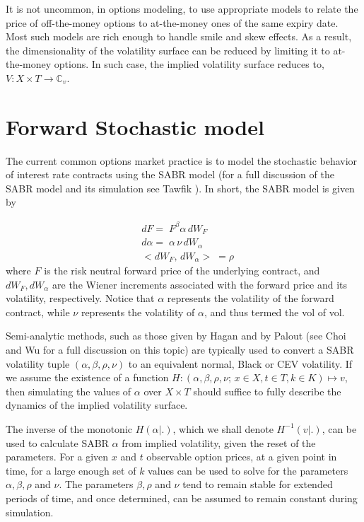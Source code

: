 \documentclass[12pt,oneside]{article}
\newcommand{\beqn}{\begin{equation}}
\newcommand{\eeqn}{\end{equation}}
\let\oin\in
\renewcommand{\in}{\!\oin\!}
\numberwithin{equation}{section}
\begin{document}
It is not uncommon, in options modeling,
to use appropriate models to relate the price of
off-the-money options to at-the-money ones of the same
expiry date.
Most such models are rich enough to handle smile and skew effects.
As a result, the dimensionality of the volatility surface can be reduced
by limiting it to at-the-money options.
In such case,
the implied volatility surface reduces to,
$V: X\times T\rightarrow \mathbb{C}_v$.

\section{Forward Stochastic model}\label{sec:sm}
The current common options market practice is to model the stochastic behavior of interest rate contracts
using the SABR model (for a full discussion of the SABR model and its simulation see Tawfik \cite{T1}).
In short, the SABR model is given by

\beqn\label{eq:sabr}
\begin{aligned}
&dF =\; F^\beta \alpha\, dW_F\\
&d\alpha =\;\alpha\, \nu\, dW_\alpha\\
&<dW_F,\, dW_\alpha> \;=\rho
\end{aligned}
\eeqn
where $F$ is the risk neutral forward price of the underlying contract,
and $dW_F, dW_\alpha$ are the Wiener increments associated with
the forward price and its volatility, respectively.
Notice that $\alpha$ represents the volatility of the forward contract,
while $\nu$ represents the volatility of $\alpha$, and thus
termed the vol of vol.

Semi-analytic methods, such as those given by Hagan and by Palout
(see Choi and Wu \cite{CW} for a full discussion on this topic)
are typically used to convert a SABR volatility tuple $(\alpha, \beta, \rho, \nu)$
to an equivalent normal, Black or CEV volatility.
If we assume the existence of a function
$H:(\alpha,\beta,\rho,\nu;\,x\in X, t\in T, k\in K)\mapsto v$,
then simulating the values of $\alpha$ over $X\times T$
should suffice to fully describe the dynamics of the implied
volatility surface.

The inverse of the monotonic $H(\alpha|.)$, which we shall denote $H^{-1}(v|.)$,
can be used to calculate SABR $\alpha$ from implied volatility,
given the reset of the parameters.
For a given $x$ and $t$ observable option prices, at a given point in time,
for a large enough set of $k$ values can be used
to solve for the parameters $\alpha, \beta, \rho$ and $\nu$.
The parameters $\beta, \rho$ and $\nu$ tend to remain stable for extended periods of time,
and once determined, can be assumed to remain constant during simulation.
\end{document}
